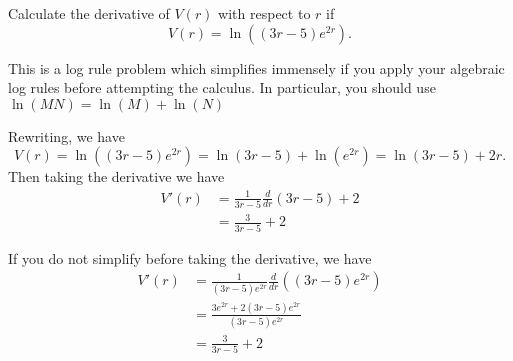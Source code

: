 \documentclass{ximera}
\author{Emma Smith Zbarsky}
\begin{document}
\begin{exercise}

Calculate the derivative of $V(r)$ with respect to $r$ if
\[V(r) = \ln\left((3r-5)e^{2r}\right).\]


\begin{hint}
This is a log rule problem which simplifies immensely if you apply your
algebraic log rules before attempting the calculus. In particular, you
should use $\ln(MN) = \ln(M)+\ln(N)$
\end{hint}


\begin{hint}
Rewriting, we have
\[V(r) = \ln\left((3r-5)e^{2r}\right) = \ln(3r-5)+\ln\left(e^{2r}\right) = \ln(3r-5)+2r.\]
Then taking the derivative we have \begin{align*}
V'(r) &= \frac{1}{3r-5}\frac{d}{dr}\left(3r-5\right) +2 \\
&= \frac{3}{3r-5}+2
\end{align*}

If you do not simplify before taking the derivative, we have
\begin{align*}
V'(r) &= \frac{1}{(3r-5)e^{2r}}\frac{d}{dr}\left((3r-5)e^{2r}\right) \\
&= \frac{3e^{2r}+2(3r-5)e^{2r}}{(3r-5)e^{2r}} \\
&= \frac{3}{3r-5} + 2
\end{align*}
\end{hint}


\begin{multipleChoice}
\end{multipleChoice}

\end{exercise}
\end{document}
